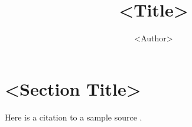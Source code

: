 \documentclass[stu,12pt,floatsintext]{apa7}
\title{<Title>}
\author{<Author>}
\begin{document}
\maketitle
\thispagestyle{plain}
\pagestyle{plain}

\section{<Section Title>}
Here is a citation to a sample source \parencite{sample2024}.

\printbibliography
\end{document}
